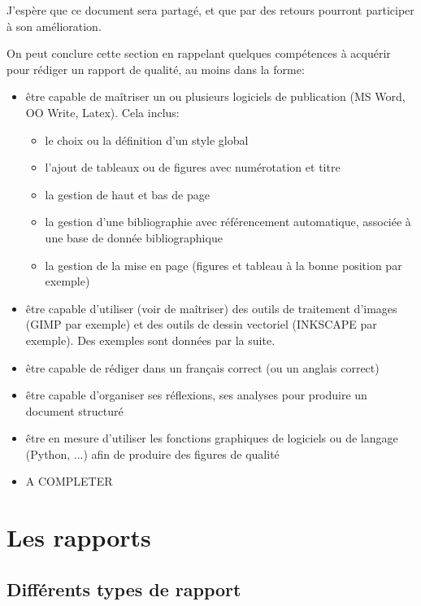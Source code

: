 J'espère  que ce document sera partagé, et que par des retours pourront  participer à son amélioration.


On peut conclure cette section en rappelant quelques compétences à acquérir pour rédiger un rapport de qualité, au moins dans la forme:

\begin{itemize}
\item être capable de maîtriser un ou plusieurs  logiciels de publication (MS Word, OO Write, Latex). Cela inclus:
	\begin{itemize}
	\item le choix ou la définition d'un style global
	\item l'ajout de tableaux ou de figures avec numérotation et titre
	\item la gestion de haut et bas de page
	\item la gestion d'une bibliographie avec référencement automatique, associée  à une  base de donnée bibliographique
	\item la gestion de la mise en page (figures et tableau à la bonne position par exemple)
	\end{itemize} 
\item être capable d'utiliser (voir de maîtriser) des outils de traitement d'images (GIMP par exemple) et des outils de dessin vectoriel (INKSCAPE par exemple).
       Des exemples sont données par la suite.
\item être capable de rédiger dans un français correct (ou un anglais correct) 
\item être capable d'organiser ses réflexions, ses analyses pour produire un document structuré 
\item être en mesure d'utiliser les fonctions graphiques de logiciels ou de langage (Python, ...) afin de produire des figures de qualité
\item \alert{A COMPLETER} 
\end{itemize}



\section{Les rapports}

\subsection{Différents types de rapport}

